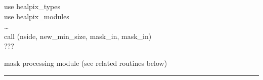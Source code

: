 \begin{example}
{
use healpix\_types \\
use healpix\_modules \\
\ldots \\
call \thedocid(nside, new\_min\_size, mask\_in, mask\_in)  \\
}
{???
}
\end{example}

\begin{modules}
  \begin{sulist}{} %
  \item[\textbf{mask\_tools}] mask processing module (see related routines below)
  \end{sulist}
\end{modules}

\begin{related}
  \begin{sulist}{} %
	\maskToolsRelated
  \end{sulist}
\end{related}

\rule{\hsize}{2mm}

\newpage
